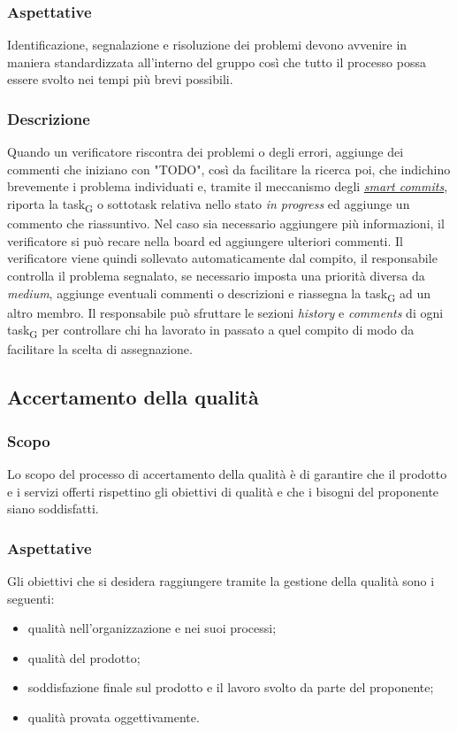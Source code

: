     \subsubsection{Aspettative}
        Identificazione, segnalazione e risoluzione dei problemi devono avvenire in maniera standardizzata all'interno del gruppo così che tutto il processo possa essere svolto nei tempi più brevi possibili.
    \subsubsection{Descrizione}
        Quando un verificatore riscontra dei problemi o degli errori, aggiunge dei commenti che iniziano con "TODO", così da facilitare la ricerca poi, che indichino brevemente i problema individuati e, tramite il meccanismo degli \hyperref[jiraintegration]{\textit{smart commits}}, riporta la task\textsubscript{G} o sottotask relativa nello stato \textit{in progress} ed aggiunge un commento che riassuntivo. Nel caso sia necessario aggiungere più informazioni, il verificatore si può recare nella board ed aggiungere ulteriori commenti. Il verificatore viene quindi sollevato automaticamente dal compito, il responsabile controlla il problema segnalato, se necessario imposta una priorità diversa da \textit{medium}, aggiunge eventuali commenti o descrizioni e riassegna la task\textsubscript{G} ad un altro membro. Il responsabile può sfruttare le sezioni \textit{history} e \textit{comments} di ogni task\textsubscript{G} per controllare chi ha lavorato in passato a quel compito di modo da facilitare la scelta di assegnazione.

\subsection{Accertamento della qualità}
    \subsubsection{Scopo}
    Lo scopo del processo di accertamento della qualità è di garantire che il prodotto e i servizi offerti rispettino gli obiettivi di qualità e che i bisogni del proponente siano soddisfatti.
    \subsubsection{Aspettative}
    Gli obiettivi che si desidera raggiungere tramite la gestione della qualità sono i seguenti:
    \begin{itemize}
    	\item qualità nell'organizzazione e nei suoi processi;
    	\item qualità del prodotto;
    	\item soddisfazione finale sul prodotto e il lavoro svolto da parte del proponente;
    	\item qualità provata oggettivamente.
    \end{itemize}
